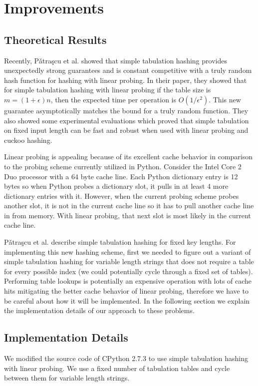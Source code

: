\documentclass[runningheads,a4paper]{llncs}
\begin{document}
\section{Improvements}

\subsection{Theoretical Results}
Recently, P\v{a}tra\c{s}cu et al. \cite{mihai} showed that simple tabulation hashing provides unexpectedly strong guarantees and is constant competitive with a truly random hash function for hashing with linear probing. In their paper, they showed that for simple tabulation hashing with linear probing if the table size is $m = (1 + \epsilon)n$, then the expected time per operation is $O(1/\epsilon^2)$. This new guarantee asymptotically matches the
bound for a truly random function. They also showed some experimental evaluations which proved that simple tabulation on fixed input length can be fast and robust when used with linear probing and cuckoo hashing. 

Linear probing is appealing because of its excellent cache behavior in
comparison to the probing scheme currently utilized in Python.  Consider the
Intel Core 2 Duo processor with a 64 byte cache line.  Each Python dictionary
entry is 12 bytes so when Python probes a dictionary slot, it pulls in at least
4 more dictionary entries with it.  However, when the current probing scheme
probes another slot, it is not in the current cache line so it has to pull
another cache line in from memory.  With linear probing, that next slot is most likely in the current cache line.

P\v{a}tra\c{s}cu et al. \cite{mihai} describe simple tabulation hashing for fixed key lengths.  For implementing this new hashing scheme, first we needed to figure out a variant of simple tabulation hashing for variable length strings that does not require a table for every possible index (we could potentially cycle through a fixed set of tables).  Performing table lookups is potentially an expensive operation with lots of cache hits mitigating the better cache behavior of linear probing, therefore we have to be careful about how it will be implemented. In the following section we explain the implementation details of our approach to these problems.

\subsection{Implementation Details}
We modified the source code of CPython 2.7.3 to use simple tabulation hashing
with linear probing.  We use a fixed number of tabulation tables and cycle between them
for variable length strings.
\end{document}
